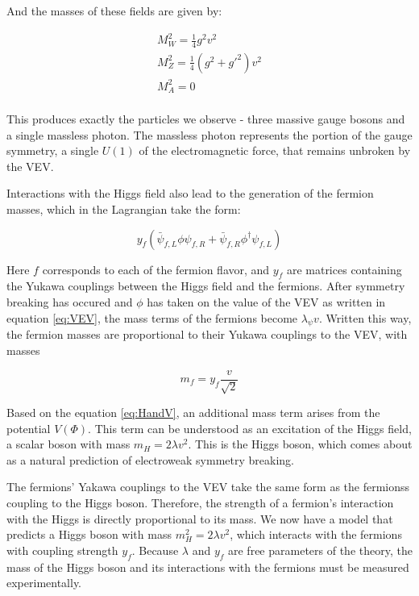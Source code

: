 And the masses of these fields are given by:

\begin{equation}
\begin{gathered}
  \label{eq:EWKmasses}
  M^2_W = \frac{1}{4}g^2v^2 \\
  M^2_Z = \frac{1}{4}(g^2+g'^2)v^2 \\
  M^2_A = 0 \\
\end{gathered}
\end{equation}

This produces exactly the particles we observe - three massive gauge bosons and a single massless photon. The massless photon represents the portion of the gauge symmetry, a single $U(1)$ of the electromagnetic force, that remains unbroken by the VEV.

Interactions with the Higgs field also lead to the generation of the fermion masses, which in the Lagrangian take the form:

\begin{equation}
  \label{eq:Lfermion}
  y_f (\bar{\psi}_{f,L}\phi \psi_{f,R} + \bar{\psi}_{f,R} \phi^\dagger \psi_{f,L})
\end{equation}

Here $f$ corresponds to each of the fermion flavor, and $y_f$ are matrices containing the Yukawa couplings between the Higgs field and the fermions. After symmetry breaking has occured and $\phi$ has taken on the value of the VEV as written in equation \ref{eq:VEV}, the mass terms of the fermions become $\lambda_\psi v$. Written this way, the fermion masses are proportional to their Yukawa couplings to the VEV, with masses 

\begin{equation}
\label{eq:fMass}
  m_f = y_f\frac{v}{\sqrt{2}}
\end{equation}

Based on the equation \ref{eq:HandV}, an additional mass term arises from the potential $V(\Phi)$. This term can be understood as an excitation of the Higgs field, a scalar boson with mass $m_H = 2\lambda v^2$. This is the Higgs boson, which comes about as a natural prediction of electroweak symmetry breaking. 

The fermions' Yakawa couplings to the VEV take the same form as the fermionss coupling to the Higgs boson. Therefore, the strength of a fermion's interaction with the Higgs is directly proportional to its mass. We now have a model that predicts a Higgs boson with mass $m^2_H = 2\lambda v^2$, which interacts with the fermions with coupling strength $y_f$. Because $\lambda$ and $y_f$ are free parameters of the theory, the mass of the Higgs boson and its interactions with the fermions must be measured experimentally. 

